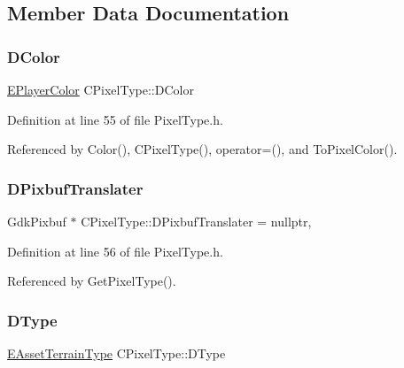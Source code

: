 \subsection{Member Data Documentation}
\hypertarget{classCPixelType_a474243cf748aee94cfa207659e940b6c}{}\label{classCPixelType_a474243cf748aee94cfa207659e940b6c} 
\subsubsection{\texorpdfstring{D\+Color}{DColor}}
{\footnotesize\ttfamily \hyperlink{GameDataTypes_8h_aafb0ca75933357ff28a6d7efbdd7602f}{E\+Player\+Color} C\+Pixel\+Type\+::\+D\+Color\hspace{0.3cm}{\ttfamily [protected]}}



Definition at line 55 of file Pixel\+Type.\+h.



Referenced by Color(), C\+Pixel\+Type(), operator=(), and To\+Pixel\+Color().

\hypertarget{classCPixelType_af1243e70d11325b487a215ae190db0a2}{}\label{classCPixelType_af1243e70d11325b487a215ae190db0a2} 
\subsubsection{\texorpdfstring{D\+Pixbuf\+Translater}{DPixbufTranslater}}
{\footnotesize\ttfamily Gdk\+Pixbuf $\ast$ C\+Pixel\+Type\+::\+D\+Pixbuf\+Translater = nullptr\hspace{0.3cm}{\ttfamily [static]}, {\ttfamily [protected]}}



Definition at line 56 of file Pixel\+Type.\+h.



Referenced by Get\+Pixel\+Type().

\hypertarget{classCPixelType_aca37f042b510a349e0d3209c73ae51c5}{}\label{classCPixelType_aca37f042b510a349e0d3209c73ae51c5} 
\subsubsection{\texorpdfstring{D\+Type}{DType}}
{\footnotesize\ttfamily \hyperlink{classCPixelType_af06457fd1c2ff34c67ce670e633a10b0}{E\+Asset\+Terrain\+Type} C\+Pixel\+Type\+::\+D\+Type\hspace{0.3cm}{\ttfamily [protected]}}



